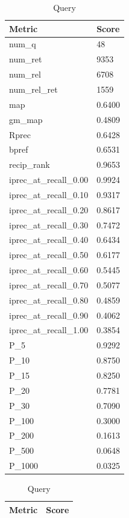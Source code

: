 \begin{table}[htb]
    \parbox{.45\linewidth}{
    \begin{tabular}{ | l | l | }
    \hline
    Metric & Score \\ \hline
	num\_q & 48 \\ \hline
	num\_ret & 9353 \\ \hline
	num\_rel & 6708 \\ \hline
	num\_rel\_ret & 1559 \\ \hline
	map & 0.6400 \\ \hline
	gm\_map & 0.4809 \\ \hline
	Rprec & 0.6428 \\ \hline
	bpref & 0.6531 \\ \hline
	recip\_rank & 0.9653 \\ \hline
	iprec\_at\_recall\_0.00 & 0.9924 \\ \hline
	iprec\_at\_recall\_0.10 & 0.9317 \\ \hline
	iprec\_at\_recall\_0.20 & 0.8617 \\ \hline
	iprec\_at\_recall\_0.30 & 0.7472 \\ \hline
	iprec\_at\_recall\_0.40 & 0.6434 \\ \hline
	iprec\_at\_recall\_0.50 & 0.6177 \\ \hline
	iprec\_at\_recall\_0.60 & 0.5445 \\ \hline
	iprec\_at\_recall\_0.70 & 0.5077 \\ \hline
	iprec\_at\_recall\_0.80 & 0.4859 \\ \hline
	iprec\_at\_recall\_0.90 & 0.4062 \\ \hline
	iprec\_at\_recall\_1.00 & 0.3854 \\ \hline
	P\_5 & 0.9292 \\ \hline
	P\_10 & 0.8750 \\ \hline
	P\_15 & 0.8250 \\ \hline
	P\_20 & 0.7781 \\ \hline
	P\_30 & 0.7090 \\ \hline
	P\_100 & 0.3000 \\ \hline
	P\_200 & 0.1613 \\ \hline
	P\_500 & 0.0648 \\ \hline
	P\_1000 & 0.0325 \\ \hline
    \end{tabular}
    \caption{Query}
    }
    \parbox{.45\linewidth}{
    \begin{tabular}{ | l | l | }
    \hline
    Metric & Score \\ \hline

\end{tabular}}
\end{table}
